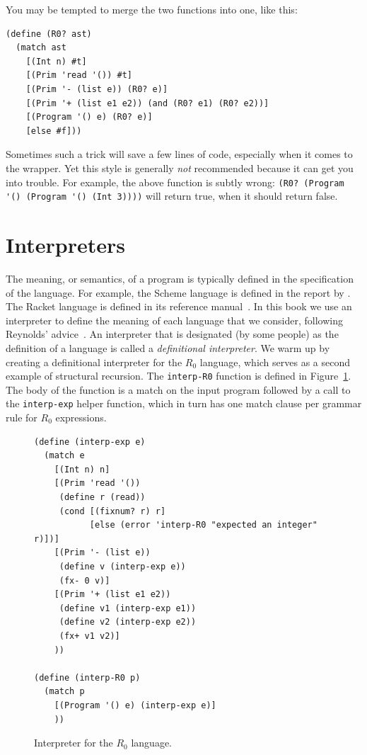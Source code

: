 \documentclass[11pt]{book}
\begin{document}
You may be tempted to merge the two functions into one, like this:
\begin{center}
\begin{minipage}{0.5\textwidth}
\begin{lstlisting}
(define (R0? ast)
  (match ast
    [(Int n) #t]
    [(Prim 'read '()) #t]
    [(Prim '- (list e)) (R0? e)]
    [(Prim '+ (list e1 e2)) (and (R0? e1) (R0? e2))]
    [(Program '() e) (R0? e)]
    [else #f]))
\end{lstlisting}
\end{minipage}
\end{center}
%
Sometimes such a trick will save a few lines of code, especially when
it comes to the  wrapper.  Yet this style is generally
\emph{not} recommended because it can get you into trouble.
%
For example, the above function is subtly wrong:
\lstinline{(R0? (Program '() (Program '() (Int 3))))}
will return true, when it should return false.



\section{Interpreters}
\label{sec:interp-R0}

The meaning, or semantics, of a program is typically defined in the
specification of the language. For example, the Scheme language is
defined in the report by \cite{SPERBER:2009aa}. The Racket language is
defined in its reference manual~\citep{plt-tr}. In this book we use an
interpreter to define the meaning of each language that we consider,
following Reynolds' advice~\citep{reynolds72:_def_interp}. An
interpreter that is designated (by some people) as the definition of a
language is called a \emph{definitional interpreter}.
We warm up by creating a definitional interpreter for the $R_0$ language, which
serves as a second example of structural recursion. The
\texttt{interp-R0} function is defined in
Figure~\ref{fig:interp-R0}. The body of the function is a match on the
input program followed by a call to the \lstinline{interp-exp} helper
function, which in turn has one match clause per grammar rule for
$R_0$ expressions.

\begin{figure}[tp]
\begin{lstlisting}
(define (interp-exp e)
  (match e
    [(Int n) n]
    [(Prim 'read '())
     (define r (read))
     (cond [(fixnum? r) r]
           [else (error 'interp-R0 "expected an integer" r)])]
    [(Prim '- (list e))
     (define v (interp-exp e))
     (fx- 0 v)]
    [(Prim '+ (list e1 e2))
     (define v1 (interp-exp e1))
     (define v2 (interp-exp e2))
     (fx+ v1 v2)]
    ))

(define (interp-R0 p)
  (match p
    [(Program '() e) (interp-exp e)]
    ))
\end{lstlisting}
\caption{Interpreter for the $R_0$ language.}
\label{fig:interp-R0}
\end{figure}
\end{document}
